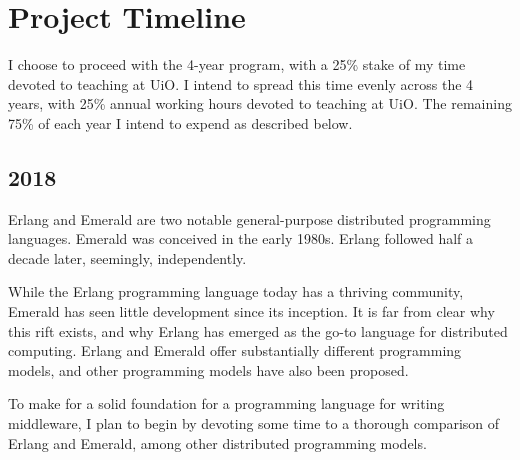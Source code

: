 \section{Project Timeline}
\label{sec:project-timeline}

I choose to proceed with the 4-year program, with a 25\% stake of my
time devoted to teaching at UiO. I intend to spread this time evenly
across the 4 years, with 25\% annual working hours devoted to teaching
at UiO. The remaining 75\% of each year I intend to expend as
described below.

\bigskip

\subsection*{2018}

Erlang\cite{armstrong2003making} and
Emerald\cite{black1987distribution} are two notable general-purpose
distributed programming languages. Emerald was conceived in the early
1980s. Erlang followed half a decade later, seemingly, independently.

While the Erlang programming language today has a thriving community,
Emerald has seen little development since its inception. It is far
from clear why this rift exists, and why Erlang has emerged as the
go-to language for distributed computing. Erlang and Emerald offer
substantially different programming models, and other programming
models have also been proposed\cite{miller2017dist-prog-book}.

To make for a solid foundation for a programming language for writing
middleware, I plan to begin by devoting some time to a thorough
comparison of Erlang and Emerald, among other distributed programming
models.
 
